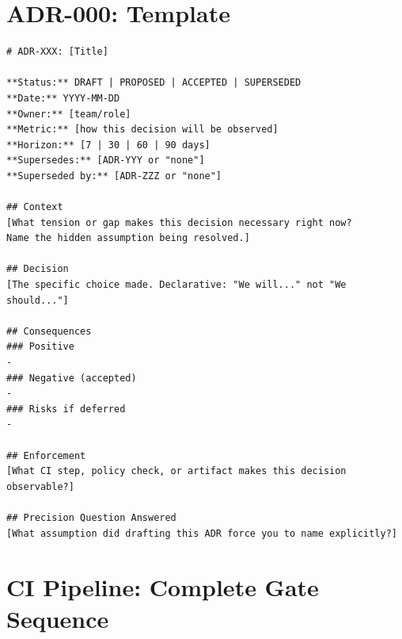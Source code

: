\documentclass[12pt,a4paper]{article}
\theoremstyle{definition}
\theoremstyle{remark}
\begin{document}
\appendix
\section{ADR-000: Template}

\begin{lstlisting}[caption={governance/adrs/adr-000-template.md}]
# ADR-XXX: [Title]

**Status:** DRAFT | PROPOSED | ACCEPTED | SUPERSEDED
**Date:** YYYY-MM-DD
**Owner:** [team/role]
**Metric:** [how this decision will be observed]
**Horizon:** [7 | 30 | 60 | 90 days]
**Supersedes:** [ADR-YYY or "none"]
**Superseded by:** [ADR-ZZZ or "none"]

## Context
[What tension or gap makes this decision necessary right now?
Name the hidden assumption being resolved.]

## Decision
[The specific choice made. Declarative: "We will..." not "We should..."]

## Consequences
### Positive
-
### Negative (accepted)
-
### Risks if deferred
-

## Enforcement
[What CI step, policy check, or artifact makes this decision observable?]

## Precision Question Answered
[What assumption did drafting this ADR force you to name explicitly?]
\end{lstlisting}

\section{CI Pipeline: Complete Gate Sequence}
\end{document}
